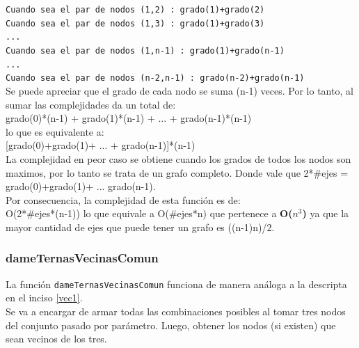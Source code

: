 \texttt{Cuando sea el par de nodos (1,2) : grado(1)+grado(2)}\\

\texttt{Cuando sea el par de nodos (1,3) : grado(1)+grado(3)}\\

\texttt{...}\\

\texttt{Cuando sea el par de nodos (1,n-1) : grado(1)+grado(n-1)}\\

\texttt{...}\\

\texttt{Cuando sea el par de nodos (n-2,n-1) : grado(n-2)+grado(n-1)}\\


Se puede apreciar que el grado de cada nodo se suma (n-1) veces. Por lo tanto, al sumar las complejidades da un total de:\\

grado(0)*(n-1) + grado(1)*(n-1) + ... + grado(n-1)*(n-1)\\

lo que es equivalente a:\\

[grado(0)+grado(1)+ ... + grado(n-1)]*(n-1)\\

La complejidad en peor caso se obtiene cuando los grados de todos los nodos son maximos, por lo tanto se trata de un grafo completo.
Donde vale que 2*\#ejes = grado(0)+grado(1)+ ... grado(n-1).\\

Por consecuencia, la complejidad de esta funci\'on es de:\\

O(2*\#ejes*(n-1)) lo que equivale a O(\#ejes*n) que pertenece a \textbf{O($n^3$)} ya que la mayor cantidad de ejes que puede tener un grafo es ((n-1)n)/2.\\

\bigskip

\subsubsection{dameTernasVecinasComun}\label{vec2}

La funci\'on \texttt{dameTernasVecinasComun} funciona de manera an\'aloga a la descripta en el inciso \ref{vec1}.\\

Se va a encargar de armar todas las combinaciones posibles al tomar tres nodos del conjunto pasado por par\'ametro. Luego, obtener los nodos (si existen) que sean vecinos de los tres.\\

